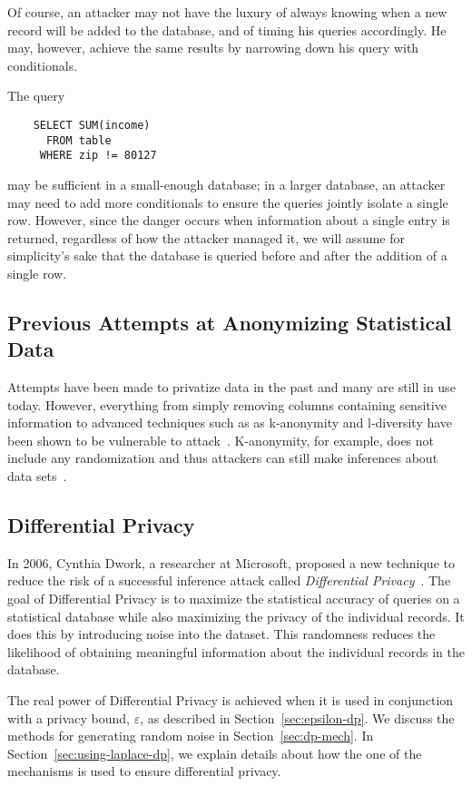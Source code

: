 \documentclass[conference,11pt]{IEEEtran}
\begin{document}
Of course, an attacker may not have the luxury of always knowing when a new
record will be added to the database, and of timing his queries accordingly. He
may, however, achieve the same results by narrowing down his query with
conditionals.

The query
\begin{verbatim}
    SELECT SUM(income)
      FROM table
     WHERE zip != 80127
\end{verbatim}
may be sufficient in a small-enough database; in a larger database, an attacker 
may need to add more conditionals to ensure the queries jointly isolate a single row. 
However, since the danger occurs when information about a single entry is returned, 
regardless of how the attacker managed it, we will assume for simplicity's sake that the
database is queried before and after the addition of a single row.

\subsection{Previous Attempts at Anonymizing Statistical Data}
Attempts have been made to privatize data in the past and many are still in use
today. However, everything from simply removing columns containing sensitive
information to advanced techniques such as as k-anonymity and
l-diversity have been shown to be vulnerable to attack~\cite{Atockar:2014}.
K-anonymity, for example, does not include any randomization and thus attackers
can still make inferences about data sets~\cite{Aggarwal:2005}.

\subsection{Differential Privacy}
In 2006, Cynthia Dwork, a researcher at Microsoft, proposed a new technique to
reduce the risk of a successful inference attack called \textit{Differential
Privacy}~\cite{Hilton:DP:history}. The goal of Differential Privacy is to
maximize the statistical accuracy of queries on a statistical database while
also maximizing the privacy of the individual records. It does this by
introducing noise into the dataset. This randomness reduces the likelihood of
obtaining meaningful information about the individual records in the database.

The real power of Differential Privacy is achieved when it is used in conjunction with a
privacy bound, $\varepsilon$, as described in Section~\ref{sec:epsilon-dp}. We discuss the
methods for generating random noise in Section~\ref{sec:dp-mech}. In Section~\ref{sec:using-laplace-dp}, 
we explain details about how the one of the mechanisms is used to ensure differential privacy.
\end{document}
